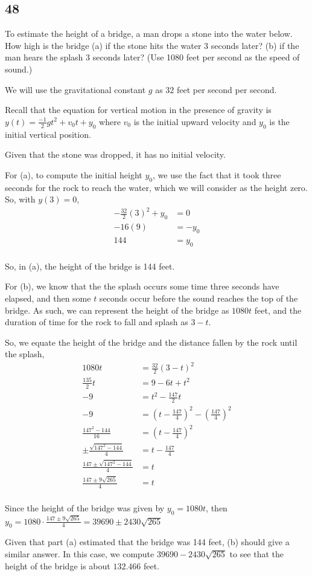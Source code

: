 \documentclass[../hw4.tex]{subfiles}
\begin{document}
\subsection*{48}
To estimate the height of a bridge, a man drops a stone into
the water below. How high is the bridge (a) if the stone hits
the water 3 seconds later? (b) if the man hears the splash
3 seconds later? (Use 1080 feet per second as the speed of
sound.)

We will use the gravitational constant $g$ as $32$ feet per second per second.

Recall that the equation for vertical motion in the presence of gravity is $y(t) = \frac{-1}{2}gt^2 + v_0t+y_0$ where $v_0$ is the initial upward velocity and $y_0$ is the initial vertical position.

Given that the stone was dropped, it has no initial velocity.

For (a), to compute the initial height $y_0$, we use the fact that it took three seconds for the rock to reach the water, which we will consider as the height zero. So, with $y(3)=0$,
\begin{align*}
    -\frac{32}{2}{(3)}^2+y_0 &= 0 \\
    -16 (9) &= -y_0 \\
    144 &= y_0 \\
\end{align*}

So, in (a), the height of the bridge is 144 feet.

For (b), we know that the the splash occurs some time three seconds have elapsed, and then some $t$ seconds occur before the sound reaches the top of the bridge. As such, we can represent the height of the bridge as $1080t$ feet, and the duration of time for the rock to fall and splash as $3-t$.

So, we equate the height of the bridge and the distance fallen by the rock until the splash,
\begin{align*}
    1080t &= \frac{32}{2}{(3-t)}^2 \\
    \frac{135}{2}t &= 9-6t+t^2 \\
    -9 &= t^2 - \frac{147}{2}t \\
    -9 &= {\left( t-\frac{147}{4} \right)}^2 - {\left( \frac{147}{4} \right)}^2 \\
    \frac{147^2-144}{16} &= {\left( t-\frac{147}{4} \right)}^2 \\
    \pm \frac{\sqrt{147^2-144}}{4} &= t - \frac{147}{4} \\
    \frac{147 \pm \sqrt{147^2-144}}{4} &= t \\
    \frac{147 \pm 9\sqrt{265}}{4} &= t \\
\end{align*}

Since the height of the bridge was given by $y_0=1080t$, then $y_0=1080\cdot\frac{147 \pm 9\sqrt{265}}{4}=39690\pm2430\sqrt{265}$

Given that part (a) estimated that the bridge was 144 feet, (b) should give a similar answer. In this case, we compute $39690-2430\sqrt{265}$ to see that the height of the bridge is about $132.466$ feet.
\end{document}
